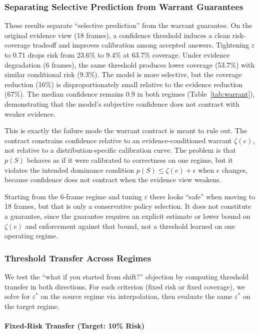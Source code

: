 \documentclass{article}
\begin{document}
\subsubsection{Separating Selective Prediction from Warrant Guarantees}

These results separate ``selective prediction'' from the warrant guarantee. On the original evidence view (18 frames), a confidence threshold induces a clean risk-coverage tradeoff and improves calibration among accepted answers. Tightening $\varepsilon$ to 0.71 drops risk from 23.6\% to 9.4\% at 63.7\% coverage. Under evidence degradation (6 frames), the same threshold produces lower coverage (53.7\%) with similar conditional risk (9.3\%). The model is more selective, but the coverage reduction (16\%) is disproportionately small relative to the evidence reduction (67\%). The median confidence remains 0.9 in both regimes (Table~\ref{tab:warrant}), demonstrating that the model's subjective confidence does not contract with weaker evidence.

This is exactly the failure mode the warrant contract is meant to rule out. The contract constrains confidence relative to an evidence-conditioned warrant $\zeta(e)$, not relative to a distribution-specific calibration curve. The problem is that $p(S)$ behaves as if it were calibrated to correctness on one regime, but it violates the intended dominance condition $p(S) \leq \zeta(e) + \epsilon$ when $e$ changes, because confidence does not contract when the evidence view weakens.

Starting from the 6-frame regime and tuning $\varepsilon$ there looks ``safe'' when moving to 18 frames, but that is only a conservative policy selection. It does not constitute a guarantee, since the guarantee requires an explicit estimate or lower bound on $\zeta(e)$ and enforcement against that bound, not a threshold learned on one operating regime.

\subsubsection{Threshold Transfer Across Regimes}

We test the ``what if you started from shift?'' objection by computing threshold transfer in both directions. For each criterion (fixed risk or fixed coverage), we solve for $\varepsilon^*$ on the source regime via interpolation, then evaluate the same $\varepsilon^*$ on the target regime.

\paragraph{Fixed-Risk Transfer (Target: 10\% Risk)}
\end{document}
